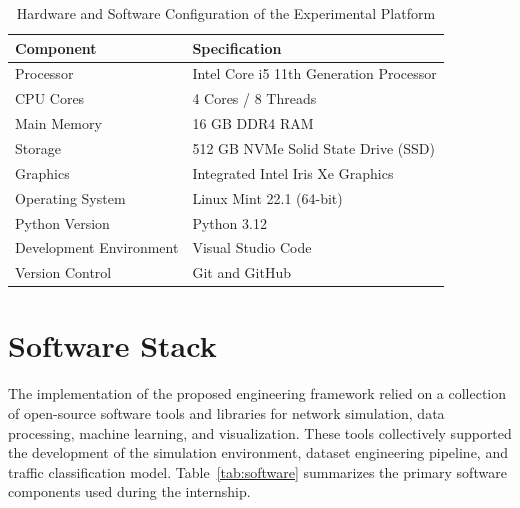 \documentclass[12pt,a4paper]{report}
\begin{document}
	\begin{table}[H]
		\centering
		\caption{Hardware and Software Configuration of the Experimental Platform}
		\label{tab:hardware}
		
		\begin{tabular}{|p{5cm}|p{8cm}|}
			\hline
			
			\textbf{Component} &
			\textbf{Specification}
			\\
			\hline
			
			Processor &
			Intel Core i5 11th Generation Processor
			\\
			\hline
			
			CPU Cores &
			4 Cores / 8 Threads
			\\
			\hline
			
			Main Memory &
			16 GB DDR4 RAM
			\\
			\hline
			
			Storage &
			512 GB NVMe Solid State Drive (SSD)
			\\
			\hline
			
			Graphics &
			Integrated Intel Iris Xe Graphics
			\\
			\hline
			
			Operating System &
			Linux Mint 22.1 (64-bit)
			\\
			\hline
			
			Python Version &
			Python 3.12
			\\
			\hline
			
			Development Environment &
			Visual Studio Code
			\\
			\hline
			
			Version Control &
			Git and GitHub
			\\
			\hline
			
		\end{tabular}
		
	\end{table}
	
	
	\section{Software Stack}
	\label{sec:software_stack}
	
	The implementation of the proposed engineering framework relied on a collection of open-source software tools and libraries for network simulation, data processing, machine learning, and visualization. These tools collectively supported the development of the simulation environment, dataset engineering pipeline, and traffic classification model. Table~\ref{tab:software} summarizes the primary software components used during the internship.
	
\end{document}
